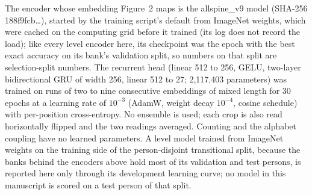 The encoder whose embedding Figure~2 maps is the allspine\_v9 model (SHA-256 188f9fcb\ldots), started by the training
script's default from ImageNet weights, which were cached on the computing grid before it trained (its log does not
record the load); like every level encoder here, its checkpoint was the epoch with the best exact accuracy on its
bank's validation split, so numbers on that split are selection-split numbers.
The recurrent head (linear 512 to 256, GELU, two-layer bidirectional GRU of width 256, linear 512 to 27; 2,117,403
parameters) was trained on runs of two to nine consecutive embeddings of mixed length for 30 epochs at a learning
rate of $10^{-3}$ (AdamW, weight decay $10^{-4}$, cosine schedule) with per-position cross-entropy.
No ensemble is used; each crop is also read horizontally flipped and the two readings averaged.
Counting and the alphabet coupling have no learned parameters.
A level model trained from ImageNet weights on the training side of the person-disjoint transitional split,
because the banks behind the encoders above hold most of its validation and test persons, is reported here only
through its development learning curve; no model in this manuscript is scored on a test person of that split.

